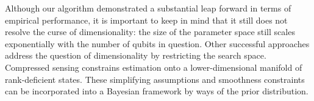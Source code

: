 Although our algorithm demonstrated a substantial leap forward in terms of empirical performance, it is important to keep in mind that it still does not resolve the curse of dimensionality: the size of the parameter space still scales exponentially with the number of qubits in question. Other successful approaches address the question of dimensionality by restricting the search space. Compressed sensing \citep{CompressedSensing} constrains estimation onto a lower-dimensional manifold of rank-deficient states. These simplifying assumptions and smoothness constraints can be incorporated into a Bayesian framework by ways of the prior distribution.